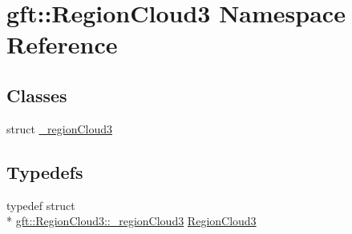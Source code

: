 \hypertarget{namespacegft_1_1RegionCloud3}{\section{gft\-:\-:Region\-Cloud3 Namespace Reference}
\label{namespacegft_1_1RegionCloud3}
}
\subsection*{Classes}
\begin{DoxyCompactItemize}
\item 
struct \hyperlink{structgft_1_1RegionCloud3_1_1__regionCloud3}{\-\_\-region\-Cloud3}
\end{DoxyCompactItemize}
\subsection*{Typedefs}
\begin{DoxyCompactItemize}
\item 
typedef struct \\*
\hyperlink{structgft_1_1RegionCloud3_1_1__regionCloud3}{gft\-::\-Region\-Cloud3\-::\-\_\-region\-Cloud3} \hyperlink{namespacegft_1_1RegionCloud3_ae97ab7136c2a2a97ccc56e60025d0a1a}{Region\-Cloud3}
\end{DoxyCompactItemize}
